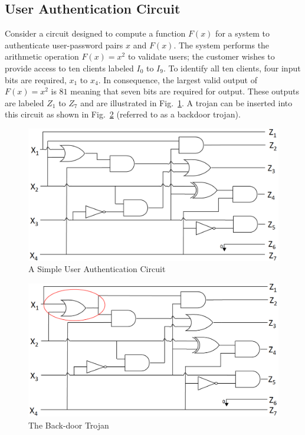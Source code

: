 \documentclass[journal, hidelinks]{IEEEtran}
\begin{document}
\subsection{User Authentication Circuit} \label{sec:userAuthentication}
Consider a circuit designed to compute a function $F(x)$ for a system to authenticate user-password pairs $x$ and $F(x)$.
The system performs the arithmetic operation $F(x) = x^2$ to validate users; the customer wishes to provide access to ten clients labeled $I_0$ to $I_9$.
To identify all ten clients, four input bits are required, $x_1$ to $x_4$.
In consequence, the largest valid output of $F(x) = x^2$ is $81$ meaning that seven bits are required for output. 
These outputs are labeled $Z_1$ to $Z_7$ and are illustrated in Fig.~\ref{fig:userAuthenticationCircuit}.
A trojan can be inserted into this circuit as shown in Fig.~\ref{fig:userAuthenticationCircuitTrojan} (referred to as a backdoor trojan).
\begin{figure}[h]
	\centering
	\includegraphics[width=0.8\linewidth]{Figures/circuit1}
	\caption{A Simple User Authentication Circuit}
	\label{fig:userAuthenticationCircuit}
\end{figure}
\begin{figure}[h]
	\centering
	\includegraphics[width=0.8\linewidth]{Figures/circuit2}
	\caption{The Back-door Trojan}
	\label{fig:userAuthenticationCircuitTrojan}
\end{figure}
\end{document}
